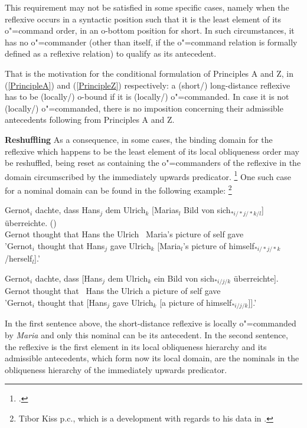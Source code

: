\documentclass[output=paper
	        ,collection
	        ,collectionchapter
 	        ,biblatex
                ,babelshorthands
                ,newtxmath
                ,draftmode
                ,colorlinks, citecolor=brown
]{langscibook}
\begin{document}
This requirement may not be satisfied in some specific cases, namely
when the reflexive occurs in a syntactic position such that it is the
least element of its \mbox{o"=command} order, in an o-bottom position for short. In such
circumstances, it has no \mbox{o"=commander} (other than itself, if the o"=command relation
is formally defined as a reflexive relation) to qualify as its antecedent.

That is the motivation for the conditional formulation of Principles A and Z, 
in (\ref{PrincipleA}) and (\ref{PrincipleZ}) respectively:
a (short/) long-distance reflexive has to be (locally/) o-bound if it is (locally/) o"=commanded.
In case it is not (locally/) o"=commanded, there is no imposition concerning
their admissible antecedents following from Principles A and Z.


\textbf{Reshuffling} As a consequence, in some cases, the binding domain for the reflexive 
which happens to be the least element of its local obliqueness order may be reshuffled, being reset as 
containing the o"=commanders of the reflexive in the domain 
circumscribed by the immediately upwards predicator.%
\footnote{
\citep{brancoHpsg:2005}.
}
One such case for a nominal domain can be found in the following example:%
%
\footnote{Tibor Kiss p.c., which is a development with regards to his 
data in \citep{kiss:2001}.}


\begin{exe}
\ex
\begin{xlist}
\ex
\gll Gernot$_{i}$ dachte, dass Hans$_{j}$ dem Ulrich$_{k}$ [Marias$_{l}$ Bild von
sich$_{*i/*j/*k/l}$] überreichte. ()\\
Gernot thought that Hans the Ulrich \mbox{ }Maria's picture of self gave\\
\trans 'Gernot$_{i}$ thought that  Hans$_{j}$ gave Ulrich$_{k}$ [Maria$_{l}$'s picture of \linebreak himself$_{*i/*j/*k}$/herself$_{l}$].'
 
\ex
\gll Gernot$_{i}$ dachte, dass [Hans$_{j}$ dem Ulrich$_{k}$ ein Bild von sich$_{*i/j/k}$ überreichte].\\
Gernot thought that \mbox{ }Hans the Ulrich a picture of self gave\\
\trans 'Gernot$_{i}$ thought that  [Hans$_{j}$ gave Ulrich$_{k}$ [a picture of \linebreak himself$_{*i/j/k}$]].'
\end{xlist}
\end{exe}

In the first sentence above, the short-distance reflexive is 
locally \mbox{o"=commanded} by {\em Maria} and only this nominal can be its
antecedent. In the second sentence, the reflexive is the first element
in its local obliqueness hierarchy and its admissible 
antecedents, which form now its local domain, are the nominals in the obliqueness
hierarchy of the immediately upwards predicator.
\end{document}
